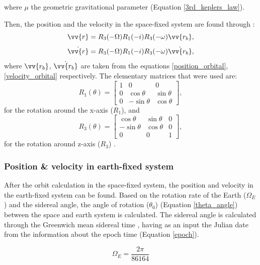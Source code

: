 where $\mu$ the geometric gravitational parameter (Equation \ref{3rd_keplers_law}).

Then, the position and the velocity in the space-fixed system are found through \cite{Montenbruck}:
\begin{equation}
\label{space-fixed}
\vv{r} = R_3 (-\Omega) R_1  (-i) R_3 (-\omega) \vv{r_{b}},
\end{equation}
\begin{equation}
\dot{\vv{r}} = R_3 (-\Omega) R_1  (-i) R_3 (-\omega) \dot{\vv{r_{b}}},
\end{equation}
where $\vv{r_{b}}$, $\dot{\vv{r_{b}}}$ are taken from the equations \ref{position_orbital}, \ref{velocity_orbital} respectively. The elementary matrices that were used are:
\begin{equation}
R_1(\theta) = \begin{bmatrix} 1 & 0 & 0 \\ 0 & \cos{\theta} & \sin{\theta} \\ 0 & -\sin{\theta} & \cos{\theta} \end{bmatrix},
\end{equation}
for the rotation around the x-axis ($R_{1}$), and
\begin{equation}
\label{R3}
R_3(\theta) = \begin{bmatrix} \cos{\theta} & \sin{\theta} & 0 \\ -\sin{\theta} & \cos{\theta} & 0 \\ 0 & 0 & 1 \end{bmatrix},
\end{equation}
for the rotation around z-axis ($R_{3}$) \cite{Montenbruck}.

\bigskip
\subsubsection{Position \& velocity in earth-fixed system}
\bigskip

After the orbit calculation in the space-fixed system, the position and velocity in the earth-fixed system can be found. Based on the rotation rate of the Earth ($\Omega_{E}$) and the sidereal angle, the angle of rotation ($\theta_{0}$) (Equation \ref{theta_angle}) between the space and earth system is calculated. The sidereal angle is calculated through the Greenwich mean sidereal time \cite{Vallado}, having as an input the Julian date from the information about the epoch time (Equation \ref{epoch}).

\begin{equation}
\label{rotation_rate}
\Omega_{E} = \frac{2 \pi}{86164}
\end{equation}

